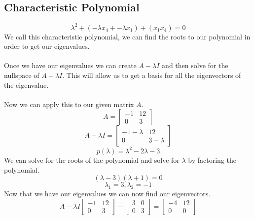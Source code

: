 \documentclass[12pt]{article}
\begin{document}
\subsection{Characteristic Polynomial}
\begin{equation*} \lambda^2+(-\lambda x_4+-\lambda x_1)+(x_1x_4) = 0\end{equation*}
We call this characteristic polynomial, we can find the roots to our polynomial in order to get our eigenvalues. \\\\Once we have our eigenvalues we can create $A-\lambda I$ and then solve for the nullspace of $A-\lambda I$. This will allow us to get a basis for all the eigenvectors of the eigenvalue.
\\\\ Now we can apply this to our given matrix $A$.
\begin{equation*}A = \begin{bmatrix}-1 & 12 \\ 0 & 3\end{bmatrix}\end{equation*}
\begin{equation*}A-\lambda I = \begin{bmatrix}-1-\lambda & 12 \\ 0 & 3-\lambda\end{bmatrix}\end{equation*}
\begin{equation*}p(\lambda) = \lambda^2-2\lambda-3\end{equation*}
 We can solve for the roots of the polynomial and solve for $\lambda$ by factoring the polynomial.
\begin{equation*}(\lambda-3)(\lambda+1) = 0 \end{equation*}
\begin{equation*}\lambda_1 = 3, \lambda_2 = -1 \end{equation*}
Now that we have our eigenvalues we can now find our eigenvectors.
\begin{equation*}A-\lambda I \begin{bmatrix}-1 & 12 \\ 0 & 3\end{bmatrix}- \begin{bmatrix}3 & 0 \\ 0 & 3\end{bmatrix} = \begin{bmatrix}-4 & 12 \\ 0 & 0\end{bmatrix} \end{equation*}
\end{document}
